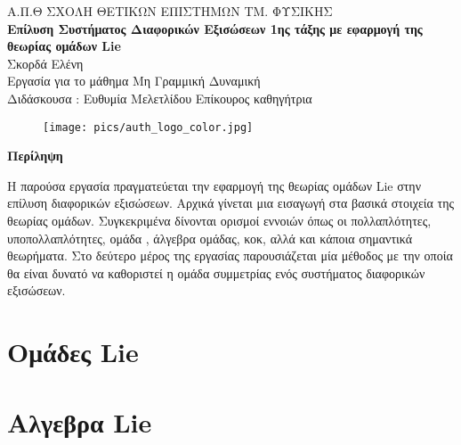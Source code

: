 \documentclass[12pt]{article}
\renewenvironment{abstract}[1][1.0]
{
	\begin{center}
		{\bf Περίληψη}\\[12pt]
		\begin{minipage}{#1\textwidth}
}
{
		\end{minipage}
	\end{center}
}
\begin{document}
	\begin{titlepage}
		\begin{center}
		\large{{\sc Α.Π.Θ} ΣΧΟΛΗ ΘΕΤΙΚΩΝ ΕΠΙΣΤΗΜΩΝ ΤΜ. ΦΥΣΙΚΗΣ}\\[0.5cm]
		\vspace{1cm}
		\LARGE\textbf{Επίλυση Συστήματος Διαφορικών Εξισώσεων 1ης τάξης με εφαρμογή της θεωρίας ομάδων \textlatin{Lie} }\\[1.0cm] 
		
		\large{Σκορδά Ελένη}\\[0.2cm]
		
		\vspace{1cm}
		\small{Εργασία για το μάθημα Μη Γραμμική Δυναμική}\\[0.1cm] 
		\small{Διδάσκουσα : Ευθυμία Μελετλίδου Επίκουρος καθηγήτρια }\\[0.2cm]
		
		\begin{figure}[H]\centering
		\texttt{[image: pics/auth\_logo\_color.jpg]}
		\end{figure}
		\end{center}
		
		\begin{abstract}
		         Η παρούσα εργασία πραγματεύεται την εφαρμογή της θεωρίας ομάδων \textlatin{Lie} στην επίλυση διαφορικών εξισώσεων. Αρχικά γίνεται μια εισαγωγή στα βασικά στοιχεία της θεωρίας ομάδων. Συγκεκριμένα δίνονται ορισμοί εννοιών όπως οι πολλαπλότητες, υποπολλαπλότητες, ομάδα , άλγεβρα ομάδας, κοκ, αλλά και κάποια σημαντικά θεωρήματα. Στο δεύτερο μέρος της εργασίας παρουσιάζεται μία μέθοδος με την οποία θα είναι δυνατό να καθοριστεί η ομάδα συμμετρίας ενός συστήματος διαφορικών εξισώσεων. 
		\end{abstract}
		\vfill
		
	\end{titlepage}
	
	\newpage
	\tableofcontents
	\newpage
	
	
	
	\nocite{topologysame}
	\nocite{coordinateCharts}
	\nocite{manifold}
	\nocite{olver2000applications}	
	\section{Ομάδες \textlatin{Lie}}
	\section{Αλγεβρα \textlatin{Lie} }
	
	\newpage
	
	
\end{document}
